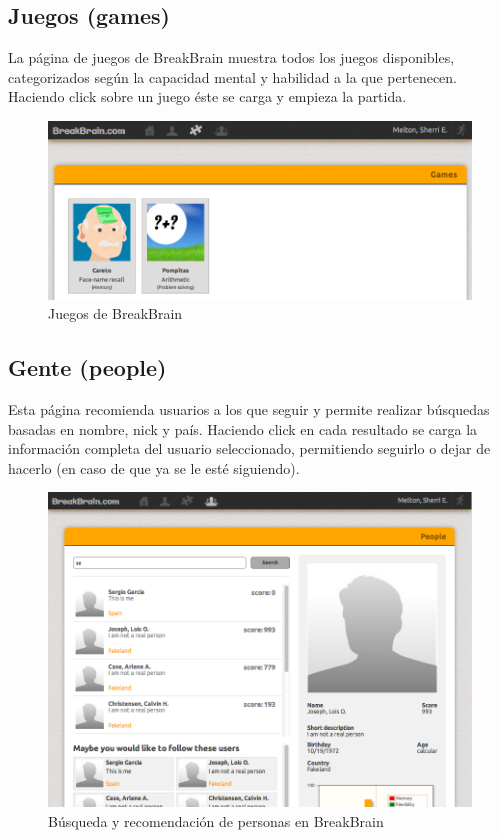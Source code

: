 \subsection{Juegos (games)}

La página de juegos de BreakBrain muestra todos los juegos disponibles, categorizados según la capacidad mental y habilidad a la que pertenecen. Haciendo click sobre un juego éste se carga y empieza la partida.

\begin{figure}[h]
  \begin{center}
    \includegraphics[width=\textwidth]{./images/page-games.png}
  \end{center}  
  \caption{Juegos de BreakBrain}
  \label{fig::page-games}
\end{figure}

\subsection{Gente (people)}

Esta página recomienda usuarios a los que seguir y permite realizar búsquedas basadas en nombre, nick y país. Haciendo click en cada resultado se carga la información completa del usuario seleccionado, permitiendo seguirlo o dejar de hacerlo (en caso de que ya se le esté siguiendo).

\begin{figure}[h]
  \begin{center}
    \includegraphics[width=\textwidth]{./images/page-people.png}
  \end{center}  
  \caption{Búsqueda y recomendación de personas en BreakBrain}
  \label{fig::page-people}
\end{figure}


